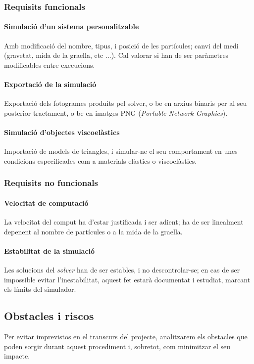 \documentclass[a4paper]{report}
\begin{document}
	\subsubsection{Requisits funcionals}
	\paragraph{Simulació d'un sistema personalitzable} Amb modificació del nombre, tipus, i posició de les partícules; canvi del medi (gravetat, mida de la graella, etc ...). Cal valorar si han de ser paràmetres modificables entre execucions.
	\paragraph{Exportació de la simulació} Exportació dels fotogrames produits pel solver, o be en arxius binaris per al seu posterior tractament, o be en imatges PNG (\textit{Portable Network Graphics}).
	\paragraph{Simulació d'objectes viscoelàstics} Importació de models de triangles, i simular-ne el seu comportament en unes condicions especificades com a materials elàstics o viscoelàstics.
	
	\subsubsection{Requisits no funcionals} 
	\paragraph{Velocitat de computació} La velocitat del comput ha d'estar justificada i ser adient; ha de ser linealment depenent al nombre de partícules o a la mida de la graella. 
	\paragraph{Estabilitat de la simulació} Les solucions del \textit{solver} han de ser estables, i no descontrolar-se; en cas de ser impossible evitar l'inestabilitat, aquest fet estarà documentat i estudiat, marcant els límits del simulador.
	
	
	\subsection{Obstacles i riscos}
	Per evitar imprevistos en el transcurs del projecte, analitzarem els obstacles que poden sorgir durant aquest procediment i, sobretot, com minimitzar el seu impacte.
\end{document}
